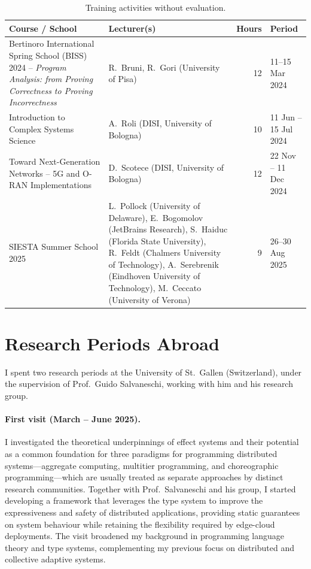 \documentclass[a4paper,11pt]{article}
\begin{document}
\begin{table}[H]
  \centering
  \footnotesize
  \caption{Training activities without evaluation.}
  \label{tab:courses-noeval}
  \begin{tabularx}{\textwidth}{@{}>{\raggedright\arraybackslash}X>{\raggedright\arraybackslash}p{4.2cm}rl@{}}
    \toprule
    Course / School & Lecturer(s) & Hours & Period \\
    \midrule
    Bertinoro International Spring School (BISS) 2024 -- \emph{Program Analysis: from Proving Correctness to Proving Incorrectness} & R.~Bruni, R.~Gori (University of Pisa) & 12 & 11--15 Mar 2024 \\ \addlinespace[3pt]
    Introduction to Complex Systems Science & A.~Roli (DISI, University of Bologna) & 10 & 11 Jun -- 15 Jul 2024 \\ \addlinespace[3pt]
    Toward Next-Generation Networks -- 5G and O-RAN Implementations & D.~Scotece (DISI, University of Bologna) & 12 & 22 Nov -- 11 Dec 2024 \\ \addlinespace[3pt]
    SIESTA Summer School 2025 & L.~Pollock (University of Delaware), E.~Bogomolov (JetBrains Research), S.~Haiduc (Florida State University), R.~Feldt (Chalmers University of Technology), A.~Serebrenik (Eindhoven University of Technology), M.~Ceccato (University of Verona) & 9 & 26--30 Aug 2025 \\
    \bottomrule
  \end{tabularx}
\end{table}

\section{Research Periods Abroad}
\label{sec:abroad}

I spent two research periods at the University of St.~Gallen (Switzerland), under the supervision of Prof.\ Guido Salvaneschi, working with him and his research group.

\paragraph{First visit (March -- June 2025).}
I investigated the theoretical underpinnings of effect systems and their potential as a common foundation for three paradigms for programming distributed systems---aggregate computing, multitier programming, and choreographic programming---which are usually treated as separate approaches by distinct research communities.
%
Together with Prof.\ Salvaneschi and his group, I started developing a framework that leverages the type system to improve the expressiveness and safety of distributed applications,
providing static guarantees on system behaviour while retaining the flexibility required by edge-cloud deployments.
%
The visit broadened my background in programming language theory and type systems, complementing my previous focus on distributed and collective adaptive systems.
\end{document}
